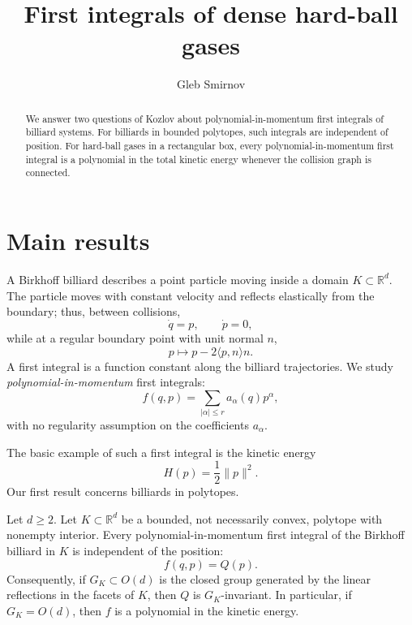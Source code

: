 \documentclass[12pt,reqno]{amsart}
\numberwithin{equation}{section}
\def \R {\mathbb{R}}
\begin{document}
\title[
First integrals of dense 
hard-ball gases
]{First integrals of dense 
hard-ball gases}

\author{Gleb Smirnov}
\address{
Mathematical Sciences Institute, 
Australian National University, Canberra, Australia}



\begin{abstract}
We answer two questions of Kozlov about polynomial-in-momentum first integrals of billiard systems. For billiards in bounded polytopes, such integrals are independent of position. For hard-ball gases in a rectangular box, every polynomial-in-momentum first integral is a polynomial in the total kinetic energy whenever the collision graph is connected. 
\end{abstract}

\maketitle
\setcounter{section}{0}

\section{Main results}\label{intro} 
A Birkhoff billiard describes a point particle moving inside a domain
\(K\subset\R^d\). The particle moves with constant velocity and reflects
elastically from the boundary; thus, between collisions,
\[
\dot q=p,\qquad \dot p=0,
\]
while at a regular boundary point with unit normal \(n\),
\[
p\longmapsto p-2\langle p,n\rangle n.
\]
A first integral is a function constant along the billiard trajectories. We study \emph{polynomial-in-momentum} first integrals:
\[
f(q,p)=\sum_{|\alpha|\le r}a_\alpha(q)p^\alpha,
\]
with no regularity assumption on the coefficients \(a_\alpha\).  
\smallskip%

The basic example of such a 
first integral is the kinetic energy
\[
H(p)=\frac12\|p\|^2.
\]
Our first result concerns billiards in polytopes.
\begin{theorem}\label{thm:birkhoff}
Let \(d\ge2\). Let \(K\subset\R^d\) be a bounded, not necessarily convex,
polytope with nonempty interior. Every polynomial-in-momentum first integral
of the Birkhoff billiard in \(K\) is independent of the position:
\[
f(q,p)=Q(p).
\]
Consequently, if \(G_K\subset O(d)\) is the closed group generated by the
linear reflections in the facets of \(K\), then \(Q\) is \(G_K\)-invariant.
In particular, if \(G_K=O(d)\), then \(f\) is a polynomial in the kinetic
energy.
\end{theorem}
\end{document}
